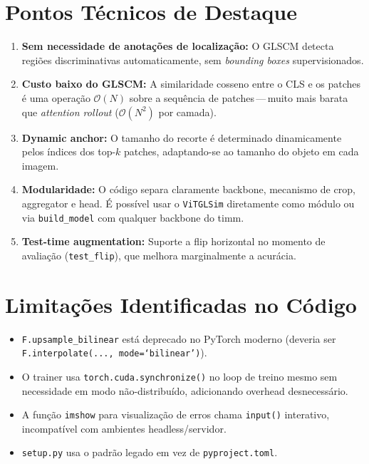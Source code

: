 \documentclass[a4paper,12pt]{scrartcl}
\newenvironment{compactitem}%
  {\begin{itemize}\setlength{\itemsep}{1pt}\setlength{\parsep}{0pt}}%
  {\end{itemize}}
\newenvironment{compactenum}%
  {\begin{enumerate}\setlength{\itemsep}{2pt}\setlength{\parsep}{0pt}}%
  {\end{enumerate}}
\begin{document}
\section{Pontos T\'ecnicos de Destaque}

\begin{compactenum}
  \item \textbf{Sem necessidade de anota\c{c}\~oes de localiza\c{c}\~ao:}
        O GLSCM detecta regi\~oes discriminativas automaticamente, sem
        \textit{bounding boxes} supervisionados.

  \item \textbf{Custo baixo do GLSCM:} A similaridade cosseno entre o CLS
        e os patches \'e uma opera\c{c}\~ao $\mathcal{O}(N)$ sobre a
        sequ\^encia de patches\,---\,muito mais barata que
        \textit{attention rollout} ($\mathcal{O}(N^2)$ por camada).

  \item \textbf{Dynamic anchor:} O tamanho do recorte \'e determinado
        dinamicamente pelos \'indices dos top-$k$ patches, adaptando-se
        ao tamanho do objeto em cada imagem.

  \item \textbf{Modularidade:} O c\'odigo separa claramente backbone,
        mecanismo de crop, aggregator e head. \'E poss\'ivel usar o
        \texttt{ViTGLSim} diretamente como m\'odulo ou via
        \texttt{build\_model} com qualquer backbone do timm.

  \item \textbf{Test-time augmentation:} Suporte a flip horizontal no
        momento de avalia\c{c}\~ao (\texttt{test\_flip}), que melhora
        marginalmente a acur\'acia.
\end{compactenum}

\section{Limita\c{c}\~oes Identificadas no C\'odigo}

\begin{compactitem}
  \item \texttt{F.upsample\_bilinear} est\'a deprecado no PyTorch moderno
        (deveria ser \texttt{F.interpolate(...,\,mode=`bilinear')}).

  \item O trainer usa \texttt{torch.cuda.synchronize()} no loop de treino
        mesmo sem necessidade em modo n\~ao-distribu\'ido, adicionando
        overhead desnecess\'ario.

  \item A fun\c{c}\~ao \texttt{imshow} para visualiza\c{c}\~ao de erros
        chama \texttt{input()} interativo, incompat\'ivel com ambientes
        headless/servidor.

  \item \texttt{setup.py} usa o padr\~ao legado em vez de
        \texttt{pyproject.toml}.
\end{compactitem}
\end{document}
